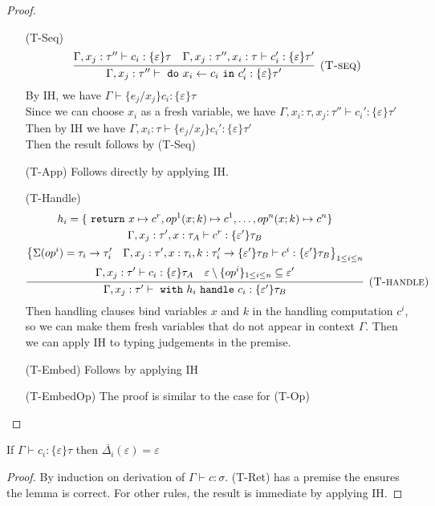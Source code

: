 \begin{lemma}
\begin{proof}
\begin{enumerate}[align=left]
\item[(T-Seq)] 
$$
\infer[\textsc{(T-seq)}]
  {\Gamma, x_j : \tau'' \vdash \m{do} x_i \leftarrow c_i \m{in} c_i' : \{\varepsilon\}\tau' }
  {\Gamma, x_j : \tau'' \vdash c_i : \{\varepsilon\}\tau & \Gamma, x_j : \tau'', x_i:\tau \vdash c_i': \{\varepsilon\}\tau'} 
  $$
By IH, we have $\Gamma \vdash \{e_j/x_j\}c_i : \{\varepsilon\}\tau$\\
Since we can choose $x_i$ as a fresh variable, we have $\Gamma, x_i : \tau, x_j : \tau'' \vdash c_i': \{\varepsilon\}\tau'$\\
Then by IH we have  $\Gamma, x_i : \tau \vdash \{e_j/x_j\}c_i': \{\varepsilon\}\tau'$\\
Then the result follows by (T-Seq)
\item[(T-App)] Follows directly by applying IH.
\item[(T-Handle)] 
$$
\infer[\textsc{(T-handle)}]
  {\Gamma, x_j : \tau' \vdash \m{with} h_i \m{handle} c_i: \{\varepsilon'\} \tau_B}
  {\begin{gathered}
  h_i = \{\m{return} x \mapsto c^r, op^1(x;k) \mapsto c^1, \dots, op^n(x;k) \mapsto c^n \}\\
  \Gamma, x_j : \tau' , x: \tau_A \vdash c^r : \{\varepsilon'\}\tau_B \\
  \left\{ \Sigma(op^i) = \tau_i \rightarrow \tau_i'  \quad \Gamma, x_j : \tau', x:\tau_i, k:\tau_i' \rightarrow \{\varepsilon'\}\tau_B \vdash c^i: \{\varepsilon'\}\tau_B    \right\}_{1 \leq i \leq n} \\
  \Gamma, x_j : \tau' \vdash c_i : \{\varepsilon\}\tau_A \quad \varepsilon \setminus \{op^i\}_{1 \leq i \leq n} \subseteq \varepsilon'
  \end{gathered}}
  $$
    Then handling clauses bind variables $x$ and $k$ in the handling computation $c^i$, so we can make them fresh variables that do not appear in context $\Gamma$. Then we can apply IH to typing judgements in the premise.
    
\item[(T-Embed)] Follows by applying IH
\item[(T-EmbedOp)] The proof is similar to  the case for (T-Op)

\end{enumerate}
\end{proof}
\end{lemma}

\begin{lemma} 
\label{lemma-exact}
If $\Gamma \vdash c_i : \{\varepsilon\}\tau$ then $\overline{\Delta_i}(\varepsilon) = \varepsilon$
\begin{proof}
By induction on derivation of $\Gamma \vdash c : \sigma$. (T-Ret) has a premise the ensures the lemma is correct. For other rules, the result is immediate by applying IH.

\end{proof}
\end{lemma}

